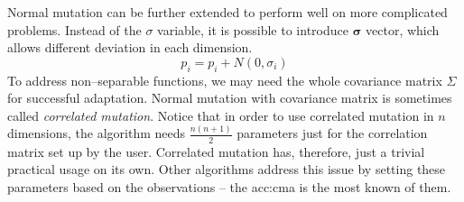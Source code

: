 Normal mutation can be further extended to perform well on more complicated problems. Instead of the $\sigma$ variable, it is possible to introduce $\boldsymbol{\sigma}$ vector, which allows different deviation in each dimension.
$$
p_i = p_i + N(0,\sigma_i)
$$ 
To address non--separable functions, we may need the whole covariance matrix $\Sigma$ for successful adaptation. Normal mutation with covariance matrix is sometimes called \emph{correlated mutation}. Notice that in order to use correlated mutation in $n$ dimensions, the algorithm needs $\frac{n\left(n+1\right)}{2}$ parameters just for the correlation matrix set up by the user. Correlated mutation has, therefore, just a trivial practical usage on its own. Other algorithms address this issue by setting these parameters based on the observations -- the \acrfull{acc:cma} is the most known of them.


